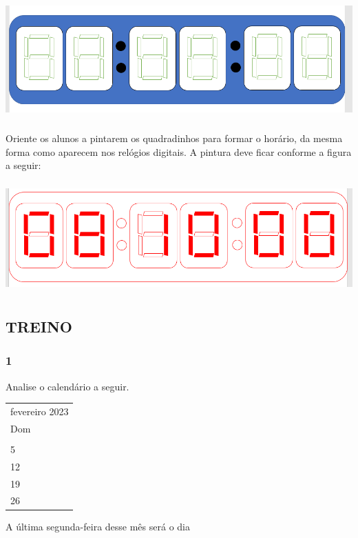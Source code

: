 \includegraphics[width=5.90556in,height=1.81944in]{media/image44.png}

Oriente os alunos a pintarem os quadradinhos para formar o
horário, da mesma forma como aparecem nos relógios digitais. A pintura
deve ficar conforme a figura a seguir:

\includegraphics[width=5.90556in,height=1.67639in]{media/image45.png}

\subsection{TREINO}\label{treino-3}

\subsubsection{1}\label{section-51}

Analise o calendário a seguir.

\begin{longtable}[]{@{}l@{}}
\toprule
fevereiro 2023\tabularnewline
Dom\tabularnewline
\tabularnewline
5\tabularnewline
12\tabularnewline
19\tabularnewline
26\tabularnewline
\bottomrule
\end{longtable}

A última segunda-feira desse mês será o dia

